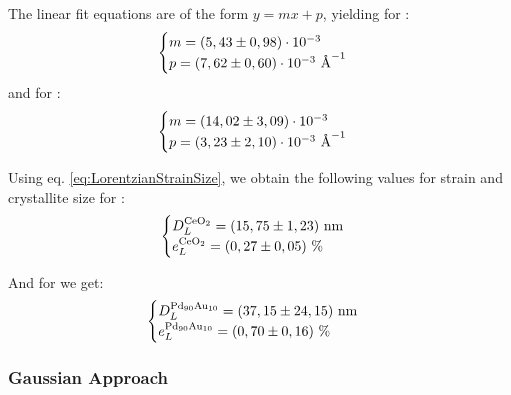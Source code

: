 \documentclass[12pt]{article}
\begin{document}
The linear fit equations are of the form $y = mx+p$, yielding for :
\[
\begin{cases}
    m = (5,43 \pm 0,98) \cdot 10^{-3}  \\
    p = (7,62 \pm 0,60) \cdot 10^{-3} \textup{~\AA}^{-1}
\end{cases}
\]
and for :
\[
\begin{cases}
    m = (14,02 \pm 3,09) \cdot 10^{-3} \\
    p = (3,23 \pm 2,10) \cdot 10^{-3} \textup{~\AA}^{-1}
\end{cases}
\]

Using eq. \ref{eq:LorentzianStrainSize}, we obtain the following values for strain and crystallite size for :
\[
\begin{cases}
    D_L^{\ce{CeO2}} = (15,75 \pm 1,23) \ \text{nm}\\
    e_L^{\ce{CeO2}} = (0,27 \pm 0,05) \ \%
\end{cases}
\]

And for  we get:
\[
\begin{cases}
    D_L^{\ce{Pd90Au10}} = (37,15 \pm 24,15) \ \text{nm}\\
    e_L^{\ce{Pd90Au10}} = (0,70 \pm 0,16) \ \%
\end{cases}
\]

\newpage
\subsubsection{Gaussian Approach}
\end{document}
